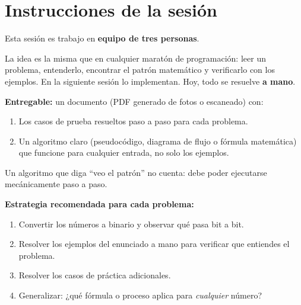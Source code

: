 \documentclass[12pt, oneside]{article}
\begin{document}

\tableofcontents
\newpage

\section{Instrucciones de la sesión}

Esta sesión es trabajo en \textbf{equipo de tres personas}.

La idea es la misma que en cualquier maratón de programación: leer un problema,
entenderlo, encontrar el patrón matemático y verificarlo con los ejemplos.
En la siguiente sesión lo implementan.  Hoy, todo se resuelve \textbf{a mano}.

\begin{advertencia}
  \textbf{Entregable:} un documento (PDF generado de fotos o escaneado) con:
  \begin{enumerate}
    \item Los casos de prueba resueltos paso a paso para cada problema.
    \item Un algoritmo claro (pseudocódigo, diagrama de flujo o fórmula
          matemática) que funcione para cualquier entrada, no solo los ejemplos.
  \end{enumerate}
  Un algoritmo que diga ``veo el patrón'' no cuenta: debe poder ejecutarse
  mecánicamente paso a paso.
\end{advertencia}

\begin{consejo}
  \textbf{Estrategia recomendada para cada problema:}
  \begin{enumerate}
    \item Convertir los números a binario y observar qué pasa bit a bit.
    \item Resolver los ejemplos del enunciado a mano para verificar que
          entiendes el problema.
    \item Resolver los casos de práctica adicionales.
    \item Generalizar: ¿qué fórmula o proceso aplica para \textit{cualquier}
          número?
  \end{enumerate}
\end{consejo}

\newpage

\end{document}
